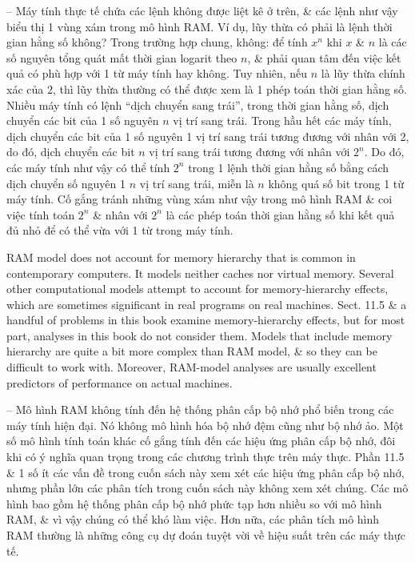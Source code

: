 \documentclass{article}
\begin{document}
\begin{itemize}
\begin{itemize}
\begin{itemize}
            -- Máy tính thực tế chứa các lệnh không được liệt kê ở trên, \& các lệnh như vậy biểu thị 1 vùng xám trong mô hình RAM. Ví dụ, lũy thừa có phải là lệnh thời gian hằng số không? Trong trường hợp chung, không: để tính $x^n$ khi $x$ \& $n$ là các số nguyên tổng quát mất thời gian logarit theo $n$, \& phải quan tâm đến việc kết quả có phù hợp với 1 từ máy tính hay không. Tuy nhiên, nếu $n$ là lũy thừa chính xác của $2$, thì lũy thừa thường có thể được xem là 1 phép toán thời gian hằng số. Nhiều máy tính có lệnh ``dịch chuyển sang trái'', trong thời gian hằng số, dịch chuyển các bit của 1 số nguyên $n$ vị trí sang trái. Trong hầu hết các máy tính, dịch chuyển các bit của 1 số nguyên 1 vị trí sang trái tương đương với nhân với 2, do đó, dịch chuyển các bit $n$ vị trí sang trái tương đương với nhân với $2^n$. Do đó, các máy tính như vậy có thể tính $2^n$ trong 1 lệnh thời gian hằng số bằng cách dịch chuyển số nguyên 1 $n$ vị trí sang trái, miễn là $n$ không quá số bit trong 1 từ máy tính. Cố gắng tránh những vùng xám như vậy trong mô hình RAM \& coi việc tính toán $2^n$ \& nhân với $2^n$ là các phép toán thời gian hằng số khi kết quả đủ nhỏ để có thể vừa với 1 từ trong máy tính.
            
            RAM model does not account for memory hierarchy that is common in contemporary computers. It models neither caches nor virtual memory. Several other computational models attempt to account for memory-hierarchy effects, which are sometimes significant in real programs on real machines. Sect. 11.5 \& a handful of problems in this book examine memory-hierarchy effects, but for most part, analyses in this book do not consider them. Models that include memory hierarchy are quite a bit more complex than RAM model, \& so they can be difficult to work with. Moreover, RAM-model analyses are usually excellent predictors of performance on actual machines.
            
            -- Mô hình RAM không tính đến hệ thống phân cấp bộ nhớ phổ biến trong các máy tính hiện đại. Nó không mô hình hóa bộ nhớ đệm cũng như bộ nhớ ảo. Một số mô hình tính toán khác cố gắng tính đến các hiệu ứng phân cấp bộ nhớ, đôi khi có ý nghĩa quan trọng trong các chương trình thực trên máy thực. Phần 11.5 \& 1 số ít các vấn đề trong cuốn sách này xem xét các hiệu ứng phân cấp bộ nhớ, nhưng phần lớn các phân tích trong cuốn sách này không xem xét chúng. Các mô hình bao gồm hệ thống phân cấp bộ nhớ phức tạp hơn nhiều so với mô hình RAM, \& vì vậy chúng có thể khó làm việc. Hơn nữa, các phân tích mô hình RAM thường là những công cụ dự đoán tuyệt vời về hiệu suất trên các máy thực tế.
            

\end{itemize}
\end{itemize}
\end{itemize}
\end{document}

